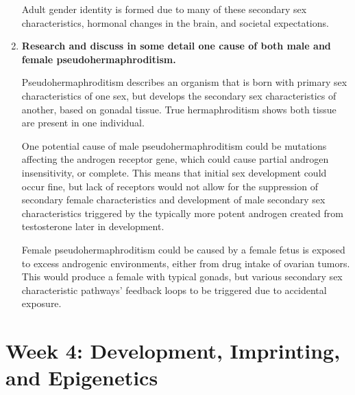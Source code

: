 \documentclass[plain,basic]{inVerba-notes}
\begin{document}
\begin{enumerate}
    Adult gender identity is formed due to many of these secondary sex characteristics, hormonal changes in the brain, and societal expectations. 

    \item \textbf{Research and discuss in some detail one cause of both male and female pseudohermaphroditism.}
    
    Pseudohermaphroditism describes an organism that is born with primary sex characteristics of one sex, but develops the secondary sex characteristics of another, based on gonadal tissue. True hermaphroditism shows both tissue are present in one individual.

    One potential cause of male pseudohermaphroditism could be mutations affecting the androgen receptor gene, which could cause partial androgen insensitivity, or complete. This means that initial sex development could occur fine, but lack of receptors would not allow for the suppression of secondary female characteristics and development of male secondary sex characteristics triggered by the typically more potent androgen created from testosterone later in development. 

    Female pseudohermaphroditism could be caused by a female fetus is exposed to excess androgenic environments, either from drug intake of ovarian tumors. This would produce a female with typical gonads, but various secondary sex characteristic pathways' feedback loops to be triggered due to accidental exposure.
  \end{enumerate}

  \section{Week 4: Development, Imprinting, and Epigenetics}
\end{document}
